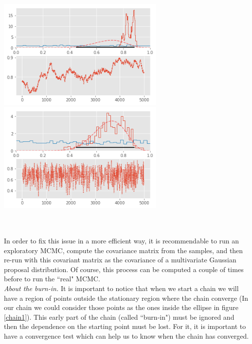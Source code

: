 \documentclass[onecolumn,           %
               showpacs,            %
               preprintnumbers,     %
               aps,                 %
               prl,          	    %
               letterpaper,             %
               superscriptaddress,      %
               nofootinbib,         %
               tightenlines,        %
               floats,floatfix      %
               ,usenatbib,
               ]{revtex4-1}
\begin{document}
\begin{minipage}{\textwidth}
\centering
\includegraphics[height=5.5cm]{Figures/chain2.png}
\includegraphics[height=5.5cm]{Figures/chain3.png}
\label{chainprop}
\end{minipage}\\ $ $ \\

In order to fix this issue in a more efficient way, it is recommendable to run an exploratory MCMC, compute the covariance matrix from the samples, and then re-run with this covariant matrix as the covariance of a multivariate Gaussian proposal distribution. Of course, this process can be computed a couple of times before to run the ``real" MCMC.\\

\textit{About the burn-in.} It is important to notice that when we start a chain we will have a region of points outside the stationary region where the chain converge (In our chain we could consider those points as the ones inside the ellipse in figure \ref{chain1}). This early part of the chain (called ``burn-in") must be ignored and then the dependence on the starting point must be lost. For it, it is important to have a convergence test which can help us to know when the chain has converged.\\
\end{document}
